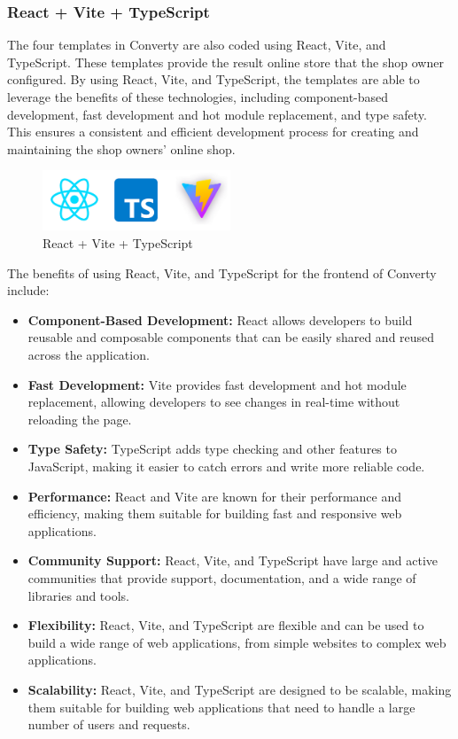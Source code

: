 \subsubsection{React + Vite + TypeScript}
The four templates in Converty are also coded using React, Vite, and TypeScript. These templates provide the result online store that the shop owner configured. By using React, Vite, and TypeScript, the templates are able to leverage the benefits of these technologies, including component-based development, fast development and hot module replacement, and type safety. This ensures a consistent and efficient development process for creating and maintaining the shop owners' online shop.

\begin{figure}[H]
    \centering
    \includegraphics[width=0.5\textwidth]{Images/reactViteTs.png}
    \caption{React + Vite + TypeScript}
    \label{fig:reactViteTypeScript}
\end{figure}

The benefits of using React, Vite, and TypeScript for the frontend of Converty include:

\begin{itemize}
    \item \textbf{Component-Based Development:} React allows developers to build reusable and composable components that can be easily shared and reused across the application.
    \item \textbf{Fast Development:} Vite provides fast development and hot module replacement, allowing developers to see changes in real-time without reloading the page.
    \item \textbf{Type Safety:} TypeScript adds type checking and other features to JavaScript, making it easier to catch errors and write more reliable code.
    \item \textbf{Performance:} React and Vite are known for their performance and efficiency, making them suitable for building fast and responsive web applications.
    \item \textbf{Community Support:} React, Vite, and TypeScript have large and active communities that provide support, documentation, and a wide range of libraries and tools.
    \item \textbf{Flexibility:} React, Vite, and TypeScript are flexible and can be used to build a wide range of web applications, from simple websites to complex web applications.
    \item \textbf{Scalability:} React, Vite, and TypeScript are designed to be scalable, making them suitable for building web applications that need to handle a large number of users and requests.
\end{itemize}

